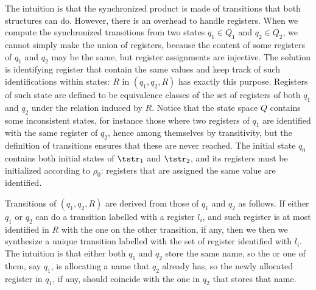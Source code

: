 \begin{definition}
\begin{itemize}
%			
\end{itemize}
\end{definition}

The intuition is that the synchronized product is made of transitions that both structures can do. However, there is an overhead to handle registers. When we compute the synchronized transitions from two states $q_1 \in Q_1$ and $q_2 \in Q_2$, we cannot simply make the union of registers, because the content of some registers of $q_1$ and $q_2$ may be the same, but register assignments are injective. The solution is identifying register that contain the same values and keep track of such identifications within states: $R$ in $(q_1,q_2,R)$ has exactly this purpose. Registers of such state are defined to be equivalence classes of the set of registers of both $q_1$ and $q_2$ under the relation induced by $R$. Notice that the state space $Q$ contains some inconsistent states, for instance those where two registers of $q_1$ are identified with the same register of $q_2$, hence among themselves by transitivity, but the definition of transitions ensures that these are never reached. The initial state $q_0$ contains both initial states of $\tstr_1$ and $\tstr_2$, and its registers must be initialized according to $\rho_0$: registers that are assigned the same value are identified. 

Transitions of $(q_1,q_2,R)$ are derived from those of $q_1$ and $q_2$ as follows. If either $q_1$ or $q_2$ can do a transition labelled with a register $l_i$, and such register is at most identified in $R$ with the one on the other transition, if any, then we then we synthesize a unique transition labelled with the set of register identified with $l_i$. The intuition is that either both $q_1$ and $q_2$ store the same name, so the   or one of them, say $q_1$, is allocating a name that $q_2$ already has, so the newly allocated register in $q_1$, if any, should coincide with the one in $q_2$ that stores that name.

